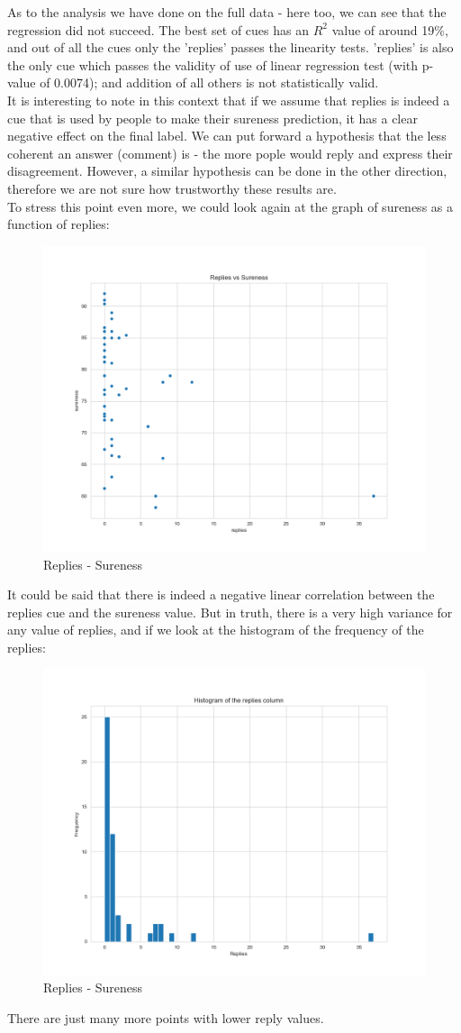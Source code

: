 \documentclass[11pt, oneside]{article}   	%
\begin{document}
As to the analysis we have done on the full data - here too, we can see that the regression did not succeed. The best set of cues has an $R^2$ value of around 19\%, and out of all the cues only the 'replies' passes the linearity tests. 'replies' is also the only cue which passes the validity of use of linear regression test (with p-value of 0.0074); and addition of all others is not statistically valid.\\
It is interesting to note in this context that if we assume that replies is indeed a cue that is used by people to make their sureness prediction, it has a clear negative effect on the final label. We can put forward a hypothesis that the less coherent an answer (comment) is - the more pople would reply and express their disagreement. However, a similar hypothesis can be done in the other direction, therefore we are not sure how trustworthy these results are.\\
To stress this point even more, we could look again at the graph of sureness as a function of replies:
\begin{figure}[H]
    \begin{center}
    \includegraphics[width=0.6\linewidth]{../plots/full_data/replies_vs_sureness}
    \caption{Replies - Sureness}
    \end{center}
\end{figure}
It could be said that there is indeed a negative linear correlation between the replies cue and the sureness value. But in truth, there is a very high variance for any value of replies, and if we look at the histogram of the frequency of the replies:
\begin{figure}[H]
    \begin{center}
    \includegraphics[width=0.6\linewidth]{../plots/replies_histogram}
    \caption{Replies - Sureness}
    \end{center}
\end{figure}
There are just many more points with lower reply values.\\
\end{document}
